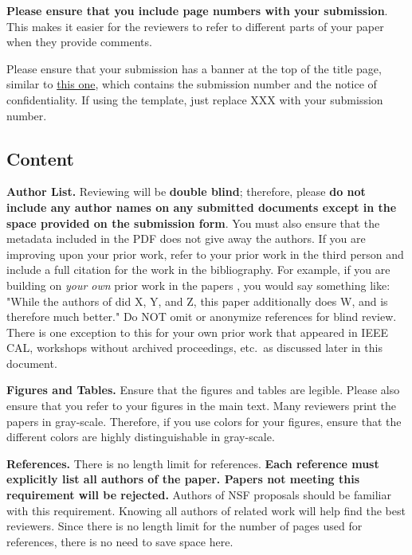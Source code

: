 \documentclass[pageno]{jpaper}
\begin{document}
\textbf{Please ensure that you include page numbers with your
submission}. This makes it easier for the reviewers to refer to different
parts of your paper when they provide comments.

Please ensure that your submission has a banner at the top of the title
page, similar to
\href{https://www.asplos2018.org/wp-content/uploads/2017/07/asplos18-template.pdf}{this
one}, which contains the submission number and the notice of
confidentiality.  If using the template, just replace XXX with your
submission number.

\subsection{Content}

\noindent\textbf{Author List.}  Reviewing will be \textbf{double blind};
therefore, please \textbf{do not include any author names on any submitted
documents except in the space provided on the submission form}.  You must
also ensure that the metadata included in the PDF does not give away the
authors. If you are improving upon your prior work, refer to your prior
work in the third person and include a full citation for the work in the
bibliography.  For example, if you are building on {\em your own} prior
work in the papers \cite{nicepaper1,nicepaper2,nicepaper3}, you would say
something like: "While the authors of
\cite{nicepaper1,nicepaper2,nicepaper3} did X, Y, and Z, this paper
additionally does W, and is therefore much better."  Do NOT omit or
anonymize references for blind review.  There is one exception to this for
your own prior work that appeared in IEEE CAL, workshops without archived
proceedings, etc.\, as discussed later in this document.

\noindent\textbf{Figures and Tables.} Ensure that the figures and tables
are legible.  Please also ensure that you refer to your figures in the main
text.  Many reviewers print the papers in gray-scale. Therefore, if you use
colors for your figures, ensure that the different colors are highly
distinguishable in gray-scale.

\noindent\textbf{References.}  There is no length limit for references.
{\bf Each reference must explicitly list all authors of the paper.  Papers
not meeting this requirement will be rejected.} Authors of NSF proposals
should be familiar with this requirement. Knowing all authors of related
work will help find the best reviewers. Since there is no length limit
for the number of pages used for references, there is no need to save space
here.
\end{document}
